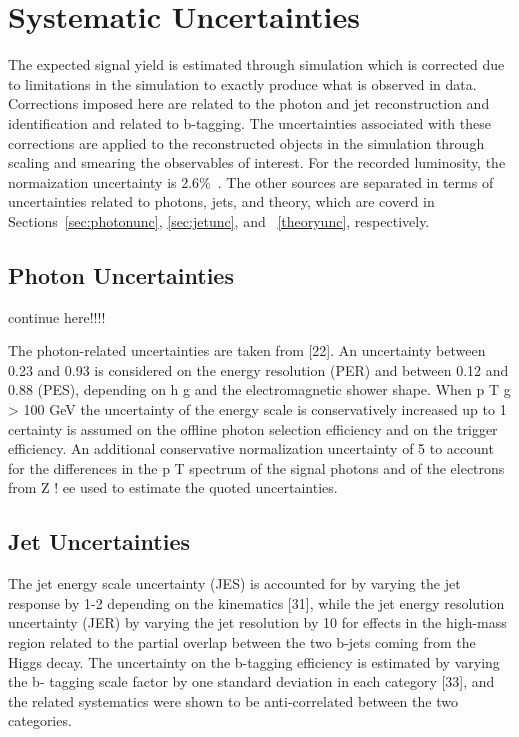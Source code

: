\chapter{Systematic Uncertainties\label{ch:uncertainties}}

The expected signal yield is estimated through simulation which is corrected
due to limitations in the simulation to exactly produce what is observed in data.
Corrections imposed here are related to the photon and jet reconstruction and identification
and related to b-tagging.
The uncertainties associated with these corrections are applied to the reconstructed objects in
the simulation through scaling and smearing the observables of interest.
For the recorded luminosity, the normaization uncertainty is 2.6\%~\cite{CMS-PAS-LUM-13-001}.
The other sources are separated in terms of uncertainties related to photons, jets, and theory,
which are coverd in Sections~\ref{sec:photonunc}, \ref{sec:jetunc}, and ~\ref{theoryunc},
respectively.

\section{Photon Uncertainties\label{sec:photonunc}}

continue here!!!!

The photon-related uncertainties are taken from [22].  An uncertainty between 0.23 and 0.93%
is considered on the energy resolution (PER) and between 0.12 and 0.88%
(PES),  depending  on
h
g
and  the  electromagnetic  shower  shape.   When
p
T
g
>
100  GeV  the
uncertainty of the energy scale is conservatively increased up to 1%
certainty is assumed on the offline photon selection efficiency and on the trigger efficiency. An
additional conservative normalization uncertainty of 5%
to account for the differences in the p
T
spectrum of the signal photons and of the electrons from
Z
!
ee used to estimate the quoted uncertainties.

\section{Jet Uncertainties\label{sec:jetunc}}

The jet energy scale uncertainty (JES) is accounted for by varying the jet response by 1-2%
depending on the kinematics [31], while the jet energy resolution uncertainty (JER) by varying
the jet resolution by 10%
for effects in the high-mass region related to the partial overlap between the two b-jets coming
from the Higgs decay. The uncertainty on the b-tagging efficiency is estimated by varying the b-
tagging scale factor by one standard deviation in each category [33], and the related systematics
were shown to be anti-correlated between the two categories.

